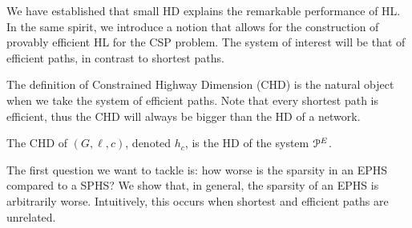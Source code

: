 We have established that small HD explains the remarkable performance of HL.
In the same spirit, we introduce a notion that allows for the construction of provably efficient HL for the CSP problem.
The system of interest will be that of efficient paths, in contrast to shortest paths.


The definition of Constrained Highway Dimension (CHD) is the natural object when we take the system of efficient paths.
Note that every shortest path is efficient, thus the CHD will always be bigger than the HD of a network.

\begin{definition}
The CHD of $(G,\ell,c)$, denoted $h_c$, is the HD of the system $\mathcal{P}^E$.
\end{definition}

The first question we want to tackle is: how worse is the sparsity in an EPHS compared to a SPHS?
We show that, in general, the sparsity of an EPHS is arbitrarily worse.
Intuitively, this occurs when shortest and efficient paths are unrelated. 


